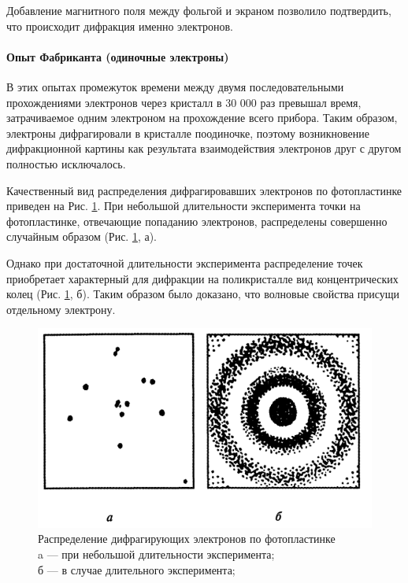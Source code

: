 Добавление магнитного поля между фольгой и экраном позволило подтвердить, что происходит дифракция именно электронов.

\newpage
\paragraph{Опыт Фабриканта (одиночные электроны)}
В этих опытах промежуток времени между двумя последовательными прохождениями электронов через кристалл в 30 000 раз превышал время, затрачиваемое одним электроном на прохождение всего прибора. Таким образом, электроны дифрагировали в кристалле поодиночке, поэтому возникновение дифракционной картины как результата взаимодействия электронов друг с другом полностью исключалось.

Качественный вид распределения дифрагировавших электронов по фотопластинке приведен на Рис. \ref{fig:fabrikant-results}. При небольшой длительности эксперимента точки на фотопластинке, отвечающие попаданию электронов, распределены совершенно случайным образом (Рис. \ref{fig:fabrikant-results}, а). 

Однако при достаточной длительности эксперимента распределение точек приобретает характерный для дифракции на поликристалле вид концентрических колец (Рис. \ref{fig:fabrikant-results}, б). Таким образом было доказано, что волновые свойства присущи отдельному электрону.
\begin{figure}[H]
	\centering
	\includegraphics[width=0.7\linewidth]{img/oral-05/fabrikant-results}
	\caption{Распределение дифрагирующих электронов по фотопластинке \\ a --- при небольшой длительности эксперимента;\\б --- в случае длительного эксперимента;}
	\label{fig:fabrikant-results}
\end{figure}

